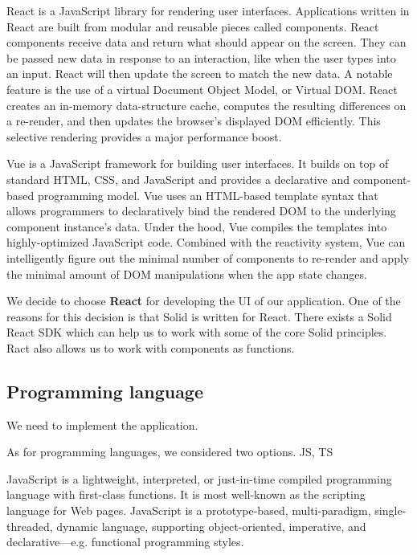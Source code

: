   React is a JavaScript library for rendering user interfaces.
  Applications written in React are built from modular and reusable pieces called components.
  React components receive data and return what should appear on the screen. 
  They can be passed new data in response to an interaction, like when the user types into an input. 
  React will then update the screen to match the new data.
  A notable feature is the use of a virtual Document Object Model, or Virtual DOM. 
  React creates an in-memory data-structure cache, computes the resulting differences on a re-render, and then updates the browser's displayed DOM efficiently. 
  This selective rendering provides a major performance boost.

  Vue is a JavaScript framework for building user interfaces. 
  It builds on top of standard HTML, CSS, and JavaScript and provides a declarative and component-based programming model.
  Vue uses an HTML-based template syntax that allows programmers to declaratively bind the rendered DOM to the underlying component instance's data.
  Under the hood, Vue compiles the templates into highly-optimized JavaScript code. 
  Combined with the reactivity system, Vue can intelligently figure out the minimal number of components to re-render and apply the minimal amount of DOM manipulations when the app state changes.

  We decide to choose \textbf{React} for developing the UI of our application.
  One of the reasons for this decision is that Solid is written for React.
  There exists a Solid React SDK which can help us to work with some of the core Solid principles.
  Ract also allows us to work with components as functions.

\subsection{Programming language}
  We need to implement the application.

  As for programming languages, we considered two options. 
  JS, TS

  JavaScript is a lightweight, interpreted, or just-in-time compiled programming language with first-class functions. 
  It is most well-known as the scripting language for Web pages. 
  JavaScript is a prototype-based, multi-paradigm, single-threaded, dynamic language, supporting object-oriented, imperative, and declarative---e.g. functional programming styles.

